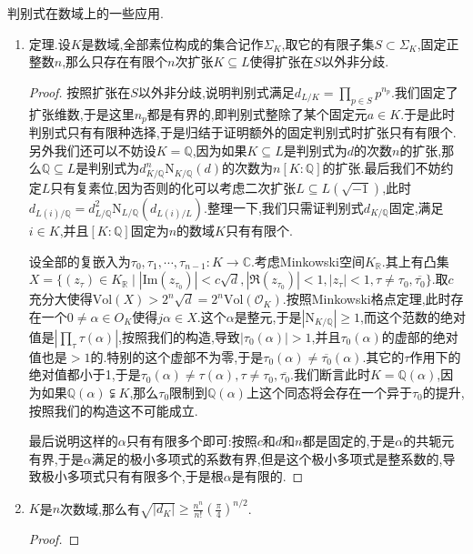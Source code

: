 判别式在数域上的一些应用.
\begin{enumerate}
	\item 定理.设$K$是数域,全部素位构成的集合记作$\Sigma_K$,取它的有限子集$S\subset\Sigma_K$,固定正整数$n$,那么只存在有限个$n$次扩张$K\subseteq L$使得扩张在$S$以外非分歧.
	\begin{proof}
		
		按照扩张在$S$以外非分歧,说明判别式满足$d_{L/K}=\prod_{p\in S}p^{n_p}$.我们固定了扩张维数,于是这里$n_p$都是有界的,即判别式整除了某个固定元$a\in K$.于是此时判别式只有有限种选择,于是归结于证明额外的固定判别式时扩张只有有限个.另外我们还可以不妨设$K=\mathbb{Q}$,因为如果$K\subseteq L$是判别式为$d$的次数$n$的扩张,那么$\mathbb{Q}\subseteq L$是判别式为$d_{K/\mathbb{Q}}^n\mathrm{N}_{K/\mathbb{Q}}(d)$的次数为$n[K:\mathbb{Q}]$的扩张.最后我们不妨约定$L$只有复素位,因为否则的化可以考虑二次扩张$L\subseteq L(\sqrt{-1})$,此时$d_{L(i)/\mathbb{Q}}=d_{L/\mathbb{Q}}^2\mathrm{N}_{L/\mathbb{Q}}(d_{L(i)/L})$.整理一下,我们只需证判别式$d_{K/\mathbb{Q}}$固定,满足$i\in K$,并且$[K:\mathbb{Q}]$固定为$n$的数域$K$只有有限个.
		
		设全部的复嵌入为$\tau_0,\tau_1,\cdots,\tau_{n-1}:K\to\mathbb{C}$.考虑Minkowski空间$K_{\mathbb{R}}$.其上有凸集$X=\{(z_{\tau})\in K_{\mathbb{R}}\mid |\mathrm{Im}(z_{\tau_0})|<c\sqrt{d},|\Re(z_{\tau_0})|<1,|z_{\tau}|<1,\tau\not=\tau_0,\overline{\tau_0}\}$.取$c$充分大使得$\mathrm{Vol}(X)>2^n\sqrt{d}=2^n\mathrm{Vol}(\mathscr{O}_K)$.按照Minkowski格点定理,此时存在一个$0\not=\alpha\in O_K$使得$j\alpha\in X$.这个$\alpha$是整元,于是$|\mathrm{N}_{K/\mathbb{Q}}|\ge1$,而这个范数的绝对值是$|\prod_{\tau}\tau(\alpha)|$,按照我们的构造,导致$|\tau_0(\alpha)|>1$,并且$\tau_0(\alpha)$的虚部的绝对值也是$>1$的.特别的这个虚部不为零,于是$\tau_0(\alpha)\not=\overline{\tau_0}(\alpha)$.其它的$\tau$作用下的绝对值都小于1,于是$\tau_0(\alpha)\not=\tau(\alpha),\tau\not=\tau_0,\overline{\tau_0}$.我们断言此时$K=\mathbb{Q}(\alpha)$,因为如果$\mathbb{Q}(\alpha)\subsetneqq K$,那么$\tau_0$限制到$\mathbb{Q}(\alpha)$上这个同态将会存在一个异于$\tau_0$的提升,按照我们的构造这不可能成立.
		
		最后说明这样的$\alpha$只有有限多个即可:按照$c$和$d$和$n$都是固定的,于是$\alpha$的共轭元有界,于是$\alpha$满足的极小多项式的系数有界,但是这个极小多项式是整系数的,导致极小多项式只有有限多个,于是根$\alpha$是有限的.
	\end{proof}
    \item $K$是$n$次数域,那么有$\sqrt{|d_K|}\ge\frac{n^n}{n!}\left(\frac{\pi}{4}\right)^{n/2}$.
    \begin{proof}
    	

\end{proof}
\end{enumerate}
